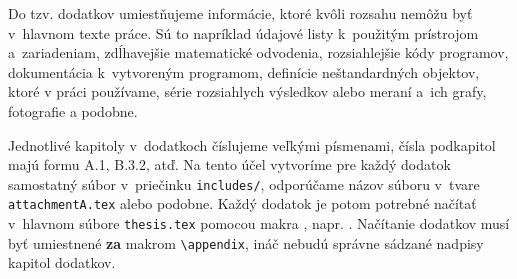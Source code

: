 Do tzv. dodatkov umiestňujeme informácie,
ktoré kvôli rozsahu nemôžu byť v~hlavnom texte práce.
Sú to napríklad údajové listy k~použitým prístrojom
a~zariadeniam, zdĺhavejšie matematické odvodenia,
rozsiahlejšie kódy programov, dokumentácia
k~vytvoreným programom, definície neštandardných objektov,
ktoré v práci používame,
série rozsiahlych výsledkov alebo meraní
a~ich grafy, fotografie a podobne.

Jednotlivé kapitoly v~dodatkoch číslujeme veľkými písmenami, čísla podkapitol majú formu A.1, B.3.2, atď.
Na tento účel vytvoríme pre každý dodatok samostatný súbor v~priečinku \verb|includes/|, odporúčame názov súboru v~tvare \verb|attachmentA.tex| alebo podobne.
Každý dodatok je potom potrebné načítať v~hlavnom súbore \verb|thesis.tex|
pomocou makra \verb||, napr. \verb||.
Načítanie dodatkov musí byť umiestnené \textbf{za} makrom \verb|\appendix|,
ináč nebudú správne sádzané nadpisy kapitol dodatkov.
